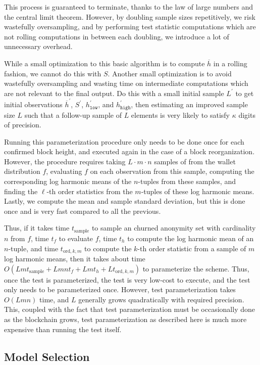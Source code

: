 \documentclass{tran-l}
\theoremstyle{cor}
\theoremstyle{definition}
\theoremstyle{remark}
\theoremstyle{conjecture}
\numberwithin{equation}{section}
\begin{document}
This process is guaranteed to terminate, thanks to the law of large numbers and the central limit theorem.
However, by doubling sample sizes repetitively, we risk wastefully oversampling, and by performing test statistic computations which are not rolling computations in between each doubling, we introduce a lot of unnecessary overhead.

While a small optimization to this basic algorithm is to compute $\overline{h}$ in a rolling fashion, we cannot do this with $S$.
Another small optimization is to avoid wastefully oversampling and wasting time on intermediate computations which are not relevant to the final output.
Do this with a small initial sample $L^\prime$ to get initial observations $\overline{h}^\prime$, $S^\prime$, $h_{\texttt{low}}^\prime$, and $h_{\texttt{high}}^\prime$, then estimating an improved sample size $L$ such that a follow-up sample of $L$ elements is very likely to satisfy $\kappa$ digits of precision.


Running this parameterization procedure only needs to be done once for each confirmed block height, and executed again in the case of a block reorganization.
However, the procedure requires taking $L\cdot m \cdot n$ samples of from the wallet distribution $f$, evaluating $f$ on each observation from this sample, computing the corresponding log harmonic means of the $n$-tuples from these samples, and finding the $\ell$-th order statistics from the $m$-tuples of these log harmonic means. Lastly, we compute the mean and sample standard deviation, but this is done once and is very fast compared to all the previous.


Thus, if it takes time $t_{\text{sample}}$ to sample an churned anonymity set with cardinality $n$ from $f$, time $t_f$ to evaluate $f$, time $t_{h}$ to compute the log harmonic mean of an $n$-tuple, and time $t_{\text{ord},k,m}$ to compute the $k$-th order statistic from a sample of $m$ log harmonic means, then it takes about time $O(Lmt_{\text{sample}} + Lmnt_f + Lmt_h + Lt_{\text{ord},k,m})$ to parameterize the scheme.
Thus, once the test is parameterized, the test is very low-cost to execute, and the test only needs to be parameterized once.
However, test parameterization takes $O(Lmn)$ time,
and $L$ generally grows quadratically with required precision.
This, coupled with the fact that test parameterization must be occasionally done as the blockchain grows, test parameterization as described here is much more expensive than running the test itself.

\subsection{Model Selection}
\end{document}

